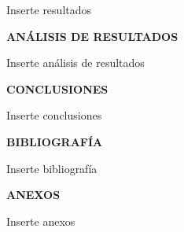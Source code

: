 \documentclass[12pt]{article}
\begin{document}
	Inserte resultados
	
	\newpage
	
	\begin{center}
		\textbf{\large ANÁLISIS DE RESULTADOS}\\
	\end{center}
	
	Inserte análisis de resultados
	
	\newpage
	
	\begin{center}
		\textbf{\large CONCLUSIONES}\\
	\end{center}
	
	Inserte conclusiones
	
	\newpage
	
	\begin{center}
		\textbf{\large BIBLIOGRAFÍA}\\
	\end{center}
	
	Inserte bibliografía
	
	\newpage
	
	\begin{center}
		\textbf{\large ANEXOS}\\
	\end{center}
	
	Inserte anexos
	
\end{document}
